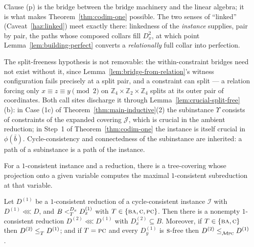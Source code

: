 \begin{hazard}\label{haz:connected-p}
Clause (p) is the bridge between the bridge machinery and the linear algebra;
it is what makes Theorem~\ref{thm:codim-one} possible. The two senses of
``linked'' (Caveat~\ref{haz:linked}) meet exactly there: linkedness of the
\emph{instance} supplies, pair by pair, the paths whose composed collars
fill $D_{x}^{2}$, at which point Lemma~\ref{lem:building-perfect} converts a
\emph{relationally} full collar into perfection.

The split-freeness hypothesis is not removable: the within-constraint
bridges need not exist without it, since
Lemma~\ref{lem:bridge-from-relation}'s witness configuration fails precisely
at a split pair, and a constraint can split --- a relation forcing only
$x\equiv z\equiv y \pmod 2$ on
$\mathbb Z_{4}\times\mathbb Z_{2}\times\mathbb Z_{4}$ splits at its outer
pair of coordinates. Both call sites
discharge it through Lemma~\ref{lem:crucial-split-free}(b): in Case (1c) of
Theorem~\ref{thm:main-inductive}(2) the subinstance $\Upsilon$ consists of
constraints of the expanded covering $\mathcal J$, which is crucial in the
ambient reduction; in Step~1 of Theorem~\ref{thm:codim-one} the instance is
itself crucial in $\phi(\bar b)$. Cycle-consistency and connectedness of the
subinstance are inherited: a path of a subinstance is a path of the
instance.
\end{hazard}

\begin{lemma}\label{lem:tree-coverings}
For a $1$-consistent instance and a reduction, there is a tree-covering whose
projection onto a given variable computes the maximal $1$-consistent
subreduction at that variable.
\end{lemma}

\begin{lemma}\label{lem:find-consistent}
Let $D^{(1)}$ be a $1$-consistent reduction of a cycle-consistent instance
$\mathcal I$ with $D^{(1)}\lll D$, and $B\subt[D_{x}]{T}D^{(1)}_{x}$ with
$T\in\{\TBA,\TC,\TPC\}$. Then there is a nonempty $1$-consistent reduction
$D^{(2)}\lll D^{(1)}$ with $D^{(2)}_{x}\subseteq B$. Moreover, if
$T\in\{\TBA,\TC\}$ then $D^{(2)}\subte{T}D^{(1)}$; and if $T=\TPC$ and every
$D^{(1)}_{y}$ is $\TS$-free then $D^{(2)}\subte{\TMPC}D^{(1)}$.
\end{lemma}

